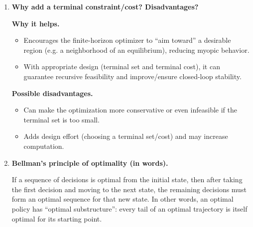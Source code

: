 \documentclass[11pt]{article}
\begin{document}
\begin{enumerate}[label=(\alph*)]
\begin{itemize}
\item If $x_0=0$: optimal $(u_0,u_1)=(-1,-1)$, giving $(x_1,x_2)=(0,0)$, and $\mu(0)=-1$.
\item If $x_0=1$: optimal $(u_0,u_1)=(-2,-1)$, giving $(x_1,x_2)=(0,0)$, and $\mu(1)=-2$.
\item If $x_0=2$: optimal $(u_0,u_1)=(-2,-1)$, giving $(x_1,x_2)=(1,1)$, and $\mu(2)=-2$.
\end{itemize}

Therefore, the MPC control law (for $x_k\in\{0,1,2\}$) is
\[
u_k = \mu(x_k)=
\begin{cases}
-1, & x_k=0,\\
-2, & x_k=1,\\
-2, & x_k=2.
\end{cases}
\]

\item \textbf{Why add a terminal constraint/cost? Disadvantages?}

\textbf{Why it helps.}
\begin{itemize}
  \item Encourages the finite-horizon optimizer to ``aim toward'' a desirable region (e.g. a neighborhood of an equilibrium), reducing myopic behavior.
  \item With appropriate design (terminal set and terminal cost), it can guarantee recursive feasibility and improve/ensure closed-loop stability.
\end{itemize}

\textbf{Possible disadvantages.}
\begin{itemize}
  \item Can make the optimization more conservative or even infeasible if the terminal set is too small.
  \item Adds design effort (choosing a terminal set/cost) and may increase computation.
\end{itemize}

\item \textbf{Bellman’s principle of optimality (in words).}

If a sequence of decisions is optimal from the initial state, then after taking the first decision and moving to the next state, the remaining decisions must form an optimal sequence for that new state. In other words, an optimal policy has ``optimal substructure'': every tail of an optimal trajectory is itself optimal for its starting point.

\end{enumerate}
\end{document}
